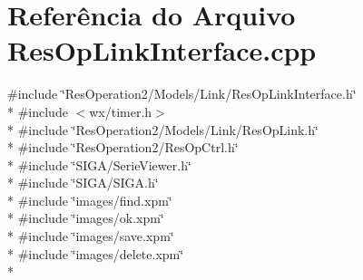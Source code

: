 \section{Referência do Arquivo Res\+Op\+Link\+Interface.\+cpp}
\label{_res_op_link_interface_8cpp}
{\ttfamily \#include \char`\"{}Res\+Operation2/\+Models/\+Link/\+Res\+Op\+Link\+Interface.\+h\char`\"{}}\\*
{\ttfamily \#include $<$wx/timer.\+h$>$}\\*
{\ttfamily \#include \char`\"{}Res\+Operation2/\+Models/\+Link/\+Res\+Op\+Link.\+h\char`\"{}}\\*
{\ttfamily \#include \char`\"{}Res\+Operation2/\+Res\+Op\+Ctrl.\+h\char`\"{}}\\*
{\ttfamily \#include \char`\"{}S\+I\+G\+A/\+Serie\+Viewer.\+h\char`\"{}}\\*
{\ttfamily \#include \char`\"{}S\+I\+G\+A/\+S\+I\+G\+A.\+h\char`\"{}}\\*
{\ttfamily \#include \char`\"{}images/find.\+xpm\char`\"{}}\\*
{\ttfamily \#include \char`\"{}images/ok.\+xpm\char`\"{}}\\*
{\ttfamily \#include \char`\"{}images/save.\+xpm\char`\"{}}\\*
{\ttfamily \#include \char`\"{}images/delete.\+xpm\char`\"{}}\\*
